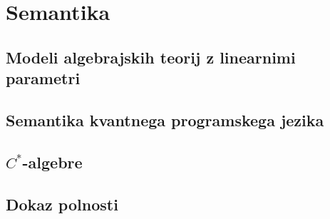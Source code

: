 \section{Semantika}

\subsection{Modeli algebrajskih teorij z linearnimi parametri}

\subsection{Semantika kvantnega programskega jezika}

\subsection{\texorpdfstring{\(C^*\)-algebre}{C*-algebre}}

\subsection{Dokaz polnosti}
